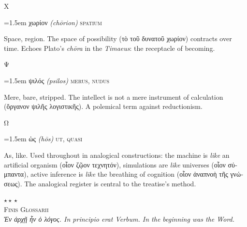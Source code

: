 \documentclass[12pt, oneside, openany]{memoir}
\newcommand{\gk}[1]{\textgreek{#1}}
\newcommand{\gkblue}[1]{{\color{greekblue}\textgreek{#1}}}
\newcommand{\gentry}[4]{%
  \noindent\hangindent=1.5em
  {\gkblue{#1}}\enspace
  {\itshape(#2)}\enspace
  {\color{rubricate}\textperiodcentered}\enspace
  {\scshape #3}\par
  \hspace*{1.5em}%
  \parbox[t]{\dimexpr\linewidth-1.5em\relax}{\strut#4\strut}%
  \par\addvspace{6pt}}
\begin{document}
\bigskip
{\centering\color{rubricate}\large\scshape Χ \par}\medskip

\gentry{χωρίον}{ch\={o}rion}{spatium}
{Space, region. The space of possibility (\gk{τὸ τοῦ δυνατοῦ χωρίον}) contracts over time. Echoes Plato's \textit{ch\={o}ra} in the \textit{Timaeus}: the receptacle of becoming.}

\bigskip
{\centering\color{rubricate}\large\scshape Ψ \par}\medskip

\gentry{ψιλός}{psilos}{merus, nudus}
{Mere, bare, stripped. The intellect is not a mere instrument of calculation (\gk{ὄργανον ψιλῆς λογιστικῆς}). A polemical term against reductionism.}

\bigskip
{\centering\color{rubricate}\large\scshape Ω \par}\medskip

\gentry{ὡς}{h\={o}s}{ut, quasi}
{As, like. Used throughout in analogical constructions: the machine is \emph{like} an artificial organism (\gk{οἷον ζῷον τεχνητόν}), simulations are \emph{like} universes (\gk{οἷον σύμπαντα}), active inference is \emph{like} the breathing of cognition (\gk{οἷον ἀναπνοὴ τῆς γνώσεως}). The analogical register is central to the treatise's method.}

\begin{center}
  {\color{capgold}\large$\star\!\star\!\star$}\\[8pt]
  {\small\scshape\color{rubricate} Finis Glossarii}\\[4pt]
  {\footnotesize\itshape\color{inkbrown}
    \gk{Ἐν ἀρχῇ ἦν ὁ λόγος.}\quad
    In principio erat Verbum.\quad
    In the beginning was the Word.}
\end{center}
\end{document}
